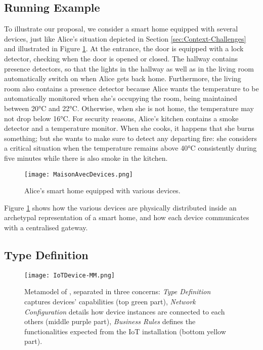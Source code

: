 \subsection{Running Example}
\label{sec:IoTDSL-Example}


To illustrate our proposal, we consider a smart home equipped with several devices, just like Alice's situation depicted in Section \ref{sec:Context-Challenges} and illustrated in Figure \ref{fig:RE}. At the entrance, the door is equipped with a lock detector, checking when the door is opened or closed. The hallway contains presence detectors, so that the lights in the hallway as well as in the living room automatically switch on when Alice gets back home. Furthermore, the living room also contains a presence detector because Alice wants the temperature to be automatically monitored when she's occupying the room, being maintained between 20°C and 22°C. Otherwise, when she is not home, the temperature may not drop below 16°C. For security reasons, Alice's kitchen contains a smoke detector and a temperature monitor. When she cooks, it happens that she burns something; but she wants to make sure to detect any departing fire: she considers a critical situation when the temperature remains above 40°C consistently during five minutes while there is also smoke in the kitchen. 

\begin{figure}%
  \texttt{[image: MaisonAvecDevices.png]}%
  \caption{Alice's smart home equipped with various devices.}%
  \label{fig:RE}%
\end{figure}


Figure \ref{fig:RE} shows how the various devices are physically distributed inside an archetypal representation of a smart home, and how each device communicates with a centralised gateway. 

\subsection{Type Definition}
\label{sec:IoTDSL-Type}

\begin{figure*}%
  \centering  
  \texttt{[image: IoTDevice-MM.png]}%
  \caption{Metamodel of \IOTDSL, separated in three concerns: \emph{Type Definition} captures devices' capabilities (top green part), \emph{Network Configuration} details how device instances are connected to each others (middle purple part), \emph{Business Rules} defines the functionalities expected from the IoT installation (bottom yellow part).}%
  \label{fig:IoTDevice-MM}%
\end{figure*}


